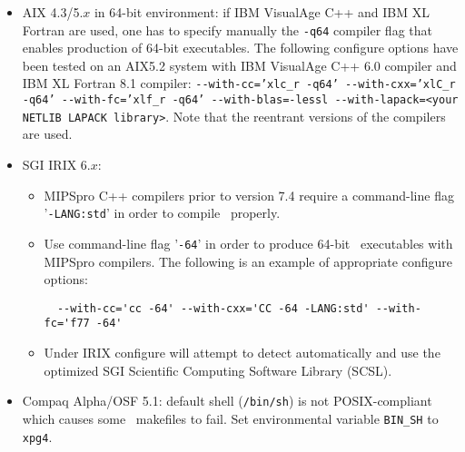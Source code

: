 \documentclass[12pt]{article}
\begin{document}
\begin{itemize}
\begin{itemize}
      {\tt -}{\tt -with-blas='-altivec -framework vecLib'} {\tt -}{\tt
        -with-lapack=' '}

  \item Pre Mac OS 10.4: Certain PSI3 codes require significant
      stackspace for compilation.  Increase your shell's stacksize
      limit before running {\tt make}.  For csh, for example, this is
      done using ``unlimit stacksize.''  [NB: This limit appears to have
      been lifted starting with Mac OS 10.3.X (Panther).]

  \item Mac 10.5 users can take advantage of the ruby driver in PSI 3.4 by
   including the following options on the configure command line:

   {\tt -}{\tt -with-ruby-include='-I/System/Library/Frameworks/Ruby.framework/Headers'} {\tt -}{\tt -with-ruby-lib='-framework Ruby'}

  \end{itemize}

\item AIX 4.3/5.$x$ in 64-bit environment:
if IBM VisualAge C++ and IBM XL Fortran are used,
one has to specify manually
the {\tt -q64} compiler flag
that enables production of 64-bit executables.
The following configure options have been tested on an AIX5.2
system with IBM VisualAge C++ 6.0 compiler and IBM XL Fortran 8.1 compiler:
{\tt -}{\tt -with-cc='xlc\_r -q64' -}{\tt -with-cxx='xlC\_r -q64'
 -}{\tt -with-fc='xlf\_r -q64' -}{\tt -with-blas=-lessl
 -}{\tt -with-lapack=<your NETLIB LAPACK library>}. Note that
the reentrant versions of the compilers
are used.

\item SGI IRIX 6.$x$:
  \begin{itemize}
   \item MIPSpro C++ compilers prior to version 7.4 require a command-line flag
   '{\tt -LANG:std}' in order to compile \PSIthree\ properly.

   \item Use command-line flag '{\tt -64}' in order to produce 64-bit \PSIthree\ executables with
   MIPSpro compilers. The following is an example of appropriate configure options:
   \begin{verbatim}
  --with-cc='cc -64' --with-cxx='CC -64 -LANG:std' --with-fc='f77 -64'
   \end{verbatim}

   \item Under IRIX configure will attempt to detect automatically and use
   the optimized SGI Scientific Computing Software Library (SCSL).
  \end{itemize}

\item Compaq Alpha/OSF 5.1: default shell ({\tt /bin/sh})
is not POSIX-compliant which causes some \PSIthree\ makefiles
to fail. Set environmental variable {\tt BIN\_SH} to {\tt xpg4}.

\end{itemize}
\end{document}

